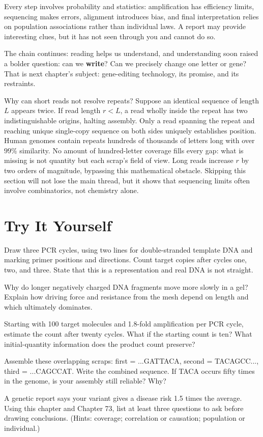 Every step involves probability and statistics: amplification has efficiency limits, sequencing makes errors, alignment introduces bias, and final interpretation relies on population associations rather than individual laws. A report may provide interesting clues, but it has not seen through you and cannot do so.

The chain continues: reading helps us understand, and understanding soon raised a bolder question: can we \textbf{write}? Can we precisely change one letter or gene? That is next chapter's subject: gene-editing technology, its promise, and its restraints.

\begin{tiaozhan}
Why can short reads not resolve repeats? Suppose an identical sequence of length $L$ appears twice. If read length $r<L$, a read wholly inside the repeat has two indistinguishable origins, halting assembly. Only a read spanning the repeat and reaching unique single-copy sequence on both sides uniquely establishes position. Human genomes contain repeats hundreds of thousands of letters long with over $99\%$ similarity. No amount of hundred-letter coverage fills every gap: what is missing is not quantity but each scrap's field of view. Long reads increase $r$ by two orders of magnitude, bypassing this mathematical obstacle. Skipping this section will not lose the main thread, but it shows that sequencing limits often involve combinatorics, not chemistry alone.
\end{tiaozhan}

\section*{Try It Yourself}

\begin{sikaoti}
\item Draw three PCR cycles, using two lines for double-stranded template DNA and marking primer positions and directions. Count target copies after cycles one, two, and three. State that this is a representation and real DNA is not straight.
\item Why do longer negatively charged DNA fragments move more slowly in a gel? Explain how driving force and resistance from the mesh depend on length and which ultimately dominates.
\item Starting with 100 target molecules and 1.8-fold amplification per PCR cycle, estimate the count after twenty cycles. What if the starting count is ten? What initial-quantity information does the product count preserve?
\item Assemble these overlapping scraps: first = ...GATTACA, second = TACAGCC..., third = ...CAGCCAT. Write the combined sequence. If TACA occurs fifty times in the genome, is your assembly still reliable? Why?
\item A genetic report says your variant gives a disease risk 1.5 times the average. Using this chapter and Chapter 73, list at least three questions to ask before drawing conclusions. (Hints: coverage; correlation or causation; population or individual.)
\end{sikaoti}
